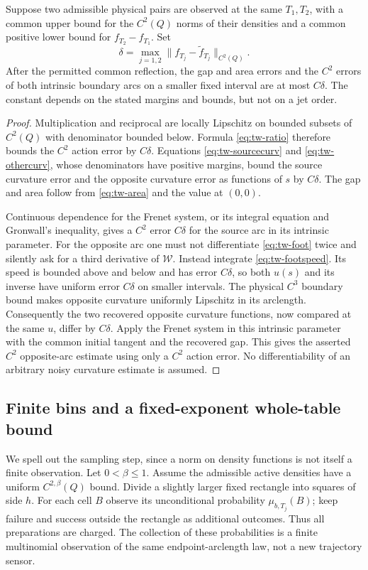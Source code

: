 \begin{proposition}
\label{prop:tw-lipschitz}
Suppose two admissible physical pairs are observed at the same $T_1,T_2$,
with a common upper bound for the $C^2(Q)$ norms of their densities and
a common positive lower bound for $f_{T_2}-f_{T_1}$. Set
\[
 \delta=\max_{j=1,2}\|f_{T_j}-\widetilde f_{T_j}\|_{C^2(Q)}.
\]
After the permitted common reflection, the gap and area errors and
the $C^2$ errors of both intrinsic boundary arcs on a smaller fixed
interval are at most $C\delta$. The constant depends on the stated
margins and bounds, but not on a jet order.
\end{proposition}
\begin{proof}
Multiplication and reciprocal are locally Lipschitz on bounded subsets
of $C^2(Q)$ with denominator bounded below. Formula
\eqref{eq:tw-ratio} therefore bounds the $C^2$ action error by
$C\delta$. Equations \eqref{eq:tw-sourcecurv} and
\eqref{eq:tw-othercurv}, whose denominators have positive margins,
bound the source curvature error and the opposite curvature error
as functions of $s$ by $C\delta$. The gap and area follow from
\eqref{eq:tw-area} and the value at $(0,0)$.

Continuous dependence for the Frenet system, or its integral equation
and Gronwall's inequality, gives a $C^2$ error $C\delta$ for the source
arc in its intrinsic parameter. For the opposite arc one must not
differentiate \eqref{eq:tw-foot} twice and silently ask for a third
derivative of $\mathcal W$. Instead integrate
\eqref{eq:tw-footspeed}. Its speed is bounded above and below and
has error $C\delta$, so both $u(s)$ and its inverse have uniform
error $C\delta$ on smaller intervals. The physical $C^3$ boundary
bound makes opposite curvature uniformly Lipschitz in its arclength.
Consequently the two recovered opposite curvature functions, now
compared at the same $u$, differ by $C\delta$. Apply the Frenet
system in this intrinsic parameter with the common initial tangent
and the recovered gap. This gives the asserted $C^2$ opposite-arc
estimate using only a $C^2$ action error. No differentiability of
an arbitrary noisy curvature estimate is assumed.
\end{proof}

\subsection{Finite bins and a fixed-exponent whole-table bound}
We spell out the sampling step, since a norm on density functions is
not itself a finite observation. Let $0<\beta\le1$. Assume the
admissible active densities have a uniform $C^{2,\beta}(Q)$ bound.
Divide a slightly larger fixed rectangle into squares of side $h$.
For each cell $B$ observe its unconditional probability
$\mu_{b,T_j}(B)$; keep failure and success outside the rectangle as
additional outcomes. Thus all preparations are charged. The collection
of these probabilities is a finite multinomial observation of the same
endpoint-arclength law, not a new trajectory sensor.

